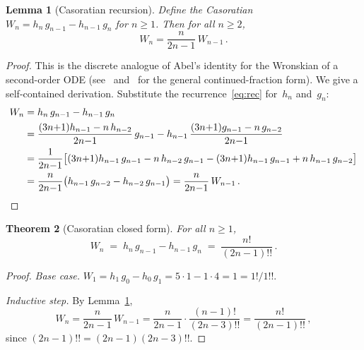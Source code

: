 \documentclass[11pt]{article}
\newcommand{\dff}[1]{(#1)!!}
\newtheorem{theorem}{Theorem}[section]
\newtheorem{lemma}[theorem]{Lemma}
\theoremstyle{remark}
\begin{document}
\begin{lemma}[Casoratian recursion]\label{lem:casoratian}
Define the Casoratian $W_n = h_n\,g_{n-1} - h_{n-1}\,g_n$ for $n \geq 1$.
Then for all $n \geq 2$,
\[
  W_n = \frac{n}{2n{-}1}\,W_{n-1}\,.
\]
\end{lemma}

\begin{proof}
This is the discrete analogue of Abel's identity for the
Wronskian of a second-order ODE
(see~\cite[\S7.2]{cuyt2008handbook}
and~\cite[Ch.~2]{lorentzen2008continued} for the general
continued-fraction form).
We give a self-contained derivation.
Substitute the recurrence~\eqref{eq:rec} for~$h_n$
and~$g_n$:
\begin{align*}
  W_n &= h_n\,g_{n-1} - h_{n-1}\,g_n \\
  &= \frac{(3n{+}1)h_{n-1} - n\,h_{n-2}}{2n{-}1}\,g_{n-1}
    - h_{n-1}\,\frac{(3n{+}1)g_{n-1} - n\,g_{n-2}}{2n{-}1} \\
  &= \frac{1}{2n{-}1}\bigl[
    (3n{+}1)h_{n-1}\,g_{n-1} - n\,h_{n-2}\,g_{n-1}
    - (3n{+}1)h_{n-1}\,g_{n-1} + n\,h_{n-1}\,g_{n-2}
    \bigr] \\
  &= \frac{n}{2n{-}1}\bigl(h_{n-1}\,g_{n-2} - h_{n-2}\,g_{n-1}\bigr)
   = \frac{n}{2n{-}1}\,W_{n-1}\,.\qedhere
\end{align*}
\end{proof}

\begin{theorem}[Casoratian closed form]\label{thm:casoratian}
For all $n \geq 1$,
\[
  W_n \;=\; h_n\,g_{n-1} - h_{n-1}\,g_n \;=\; \frac{n!}{\dff{2n{-}1}}\,.
\]
\end{theorem}

\begin{proof}
\emph{Base case.}  $W_1 = h_1\,g_0 - h_0\,g_1 = 5\cdot 1 - 1\cdot 4 = 1 = 1!/1!!$.

\emph{Inductive step.}  By Lemma~\ref{lem:casoratian},
\[
  W_n = \frac{n}{2n{-}1}\,W_{n-1}
  = \frac{n}{2n{-}1}\cdot\frac{(n{-}1)!}{\dff{2n{-}3}}
  = \frac{n!}{\dff{2n{-}1}}\,,
\]
since $\dff{2n{-}1} = (2n{-}1)\dff{2n{-}3}$.
\end{proof}
\end{document}
